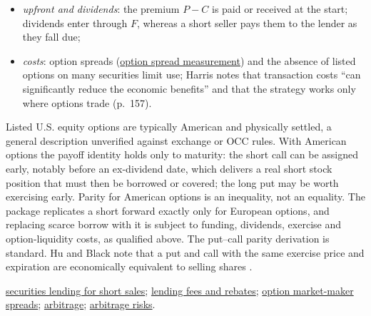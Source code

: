 \begin{qfresult}
\begin{itemize}
\emph{Evidence}. Ofek, Richardson and Whitelaw test put--call parity on individual U.S.\ stock options from OptionMetrics end-of-day quotes, on 118 dates about five business days apart from July 1999 to November 2001. They measure the cost of shorting by the \emph{rebate rate spread}, the gap between the rate a short seller earns on sale proceeds and the standard rate \citep[abstract; sec.~II.C, pp.~8--9]{orw-2002-nber}. Violations are ``asymmetric in the direction of short sales constraints'' and strongly related to the rebate spread, and they persist after option and equity-lending transaction costs. Violations and rebate spreads also predict future stock returns (abstract). So scarce borrow is priced into options, in that sample and period: the synthetic short does not escape the borrow cost but pays it through the option prices;
\item \emph{upfront and dividends}: the premium $P-C$ is paid or received at the start; dividends enter through $F$, whereas a short seller pays them to the lender as they fall due;
\item \emph{costs}: option spreads (\hyperref[meth:option-spread-measurement]{option spread measurement}) and the absence of listed options on many securities limit use; Harris notes that transaction costs ``can significantly reduce the economic benefits'' and that the strategy works only where options trade (p.~157).
\end{itemize}

 Listed U.S. equity options are typically American and physically settled, a general description unverified against exchange or OCC rules. With American options the payoff identity holds only to maturity: the short call can be assigned early, notably before an ex-dividend date, which delivers a real short stock position that must then be borrowed or covered; the long put may be worth exercising early. Parity for American options is an inequality, not an equality. The package replicates a short forward exactly only for European options, and replacing scarce borrow with it is subject to funding, dividends, exercise and option-liquidity costs, as qualified above. The put--call parity derivation is standard. Hu and Black note that a put and call with the same exercise price and expiration are economically equivalent to selling shares \citep[working-paper version, p.~5, footnote~6]{cfd-hu-black-2007}.

 \hyperref[mech:securities-lending-short-sale]{securities lending for short sales}; \hyperref[def:securities-lending-fee-rebate]{lending fees and rebates}; \hyperref[res:option-market-maker-spreads]{option market-maker spreads}; \hyperref[def:arbitrage]{arbitrage}; \hyperref[res:arbitrage-risks]{arbitrage risks}.

\end{qfresult}

